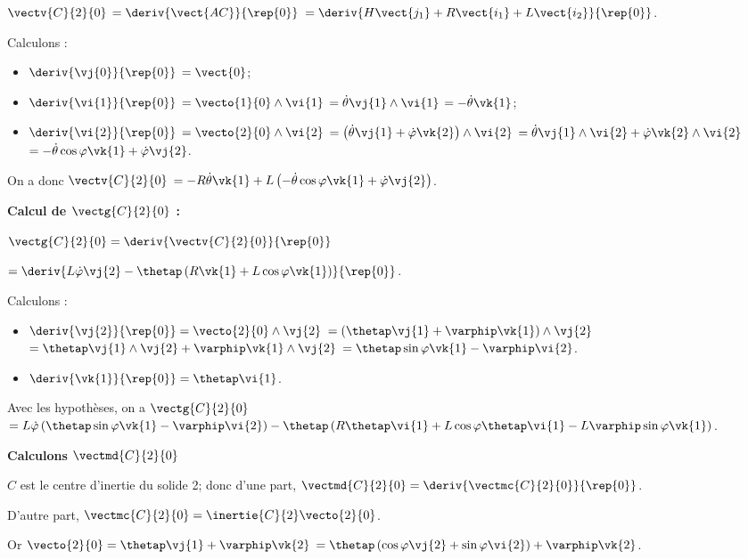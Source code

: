 $\vectv{C}{2}{0}$ 
$=\deriv{\vect{AC}}{\rep{0}}$
$=\deriv{H\vect{j_1}+R\vect{i_1}+L\vect{i_2}}{\rep{0}}$.

Calculons : 
\begin{itemize}
\item $\deriv{\vj{0}}{\rep{0}}$ $=\vect{0}$;
\item $\deriv{\vi{1}}{\rep{0}}$ $=\vecto{1}{0} \wedge \vi{1}$ $=\dot{\theta}\vj{1} \wedge \vi{1}$ $=-\dot{\theta}\vk{1}$;
\item $\deriv{\vi{2}}{\rep{0}}$ $=\vecto{2}{0} \wedge \vi{2}$ 
$=\left(\dot{\theta}\vj{1} + \dot{\varphi}\vk{2}\right)\wedge \vi{2}$
$=\dot{\theta}\vj{1}\wedge \vi{2} + \dot{\varphi}\vk{2}\wedge \vi{2}$
$=-\dot{\theta}\cos\varphi\vk{1} + \dot{\varphi}\vj{2}$.
\end{itemize}

On a donc 
$\vectv{C}{2}{0}$ 
$= -R\dot{\theta}\vk{1}+L\left(-\dot{\theta}\cos\varphi\vk{1} + \dot{\varphi}\vj{2}\right)$.

\textbf{Calcul de $\vectg{C}{2}{0}$ : }  

$\vectg{C}{2}{0} =\deriv{\vectv{C}{2}{0}}{\rep{0}}$

$ =\deriv{ L\dot{\varphi}\vj{2}-\thetap\left( R\vk{1}+L\cos\varphi\vk{1}\right)}{\rep{0}} $.

Calculons :
\begin{itemize}
\item $\deriv{\vj{2}}{\rep{0}}=\vecto{2}{0}\wedge\vj{2}$ 
$=\left(\thetap\vj{1}+\varphip\vk{1} \right)\wedge\vj{2}$ 
$=\thetap\vj{1}\wedge\vj{2}+\varphip\vk{1} \wedge\vj{2}$
$=\thetap\sin\varphi\vk{1}-\varphip\vi{2} $.
\item $\deriv{\vk{1}}{\rep{0}} = \thetap\vi{1}$.
\end{itemize}


Avec les hypothèses, on a $\vectg{C}{2}{0} $
$ =L\dot{\varphi}\left(\thetap\sin\varphi\vk{1}-\varphip\vi{2}\right)
-\thetap\left( R \thetap\vi{1} +L\cos\varphi \thetap\vi{1}
-L\varphip\sin\varphi\vk{1}\right)
$.



\vspace{.5cm}

\textbf{Calculons $\vectmd{C}{2}{0}$}

$C$ est le centre d'inertie du solide 2; donc 
d'une part, $\vectmd{C}{2}{0} = \deriv{\vectmc{C}{2}{0} }{\rep{0}}$.

 D'autre part, $\vectmc{C}{2}{0} = \inertie{C}{2}\vecto{2}{0}$. 
 
 Or $\vecto{2}{0} = \thetap \vj{1} + \varphip\vk{2}$ $= \thetap \left(\cos\varphi \vj{2} + \sin\varphi \vi{2}\right) + \varphip\vk{2}$.
 
